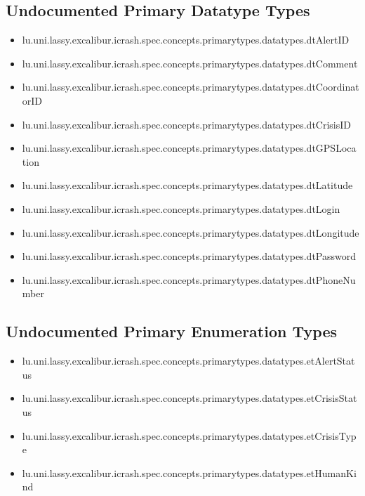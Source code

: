 \subsection[Undocumented Primary Datatype Types]{Undocumented Primary Datatype Types}
\begin{itemize}
\item lu.uni.lassy.excalibur.icrash.spec.concepts.primarytypes.datatypes.dtAlertID 
\item lu.uni.lassy.excalibur.icrash.spec.concepts.primarytypes.datatypes.dtComment 
\item lu.uni.lassy.excalibur.icrash.spec.concepts.primarytypes.datatypes.dtCoordinatorID 
\item lu.uni.lassy.excalibur.icrash.spec.concepts.primarytypes.datatypes.dtCrisisID 
\item lu.uni.lassy.excalibur.icrash.spec.concepts.primarytypes.datatypes.dtGPSLocation 
\item lu.uni.lassy.excalibur.icrash.spec.concepts.primarytypes.datatypes.dtLatitude 
\item lu.uni.lassy.excalibur.icrash.spec.concepts.primarytypes.datatypes.dtLogin 
\item lu.uni.lassy.excalibur.icrash.spec.concepts.primarytypes.datatypes.dtLongitude 
\item lu.uni.lassy.excalibur.icrash.spec.concepts.primarytypes.datatypes.dtPassword 
\item lu.uni.lassy.excalibur.icrash.spec.concepts.primarytypes.datatypes.dtPhoneNumber 
\end{itemize}

\subsection[Undocumented Primary Enumeration Types]{Undocumented Primary Enumeration Types}
\begin{itemize}
\item lu.uni.lassy.excalibur.icrash.spec.concepts.primarytypes.datatypes.etAlertStatus 
\item lu.uni.lassy.excalibur.icrash.spec.concepts.primarytypes.datatypes.etCrisisStatus 
\item lu.uni.lassy.excalibur.icrash.spec.concepts.primarytypes.datatypes.etCrisisType 
\item lu.uni.lassy.excalibur.icrash.spec.concepts.primarytypes.datatypes.etHumanKind 
\end{itemize}






